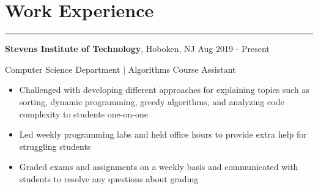 \documentclass[10pt]{article}
\newcommand{\resumesection}[1]{\vspace{-0.2cm}\section*{#1}\vspace{-0.2cm}\hrule\vspace{0.2cm}}
\begin{document}


\resumesection{Work Experience}

\textbf{Stevens Institute of Technology}, Hoboken, NJ \hfill Aug 2019 - Present\par
Computer Science Department $\vert$ Algorithms Course Assistant %
\begin{itemize}
	\item Challenged with developing different approaches for explaining topics such as sorting, dynamic programming, greedy algorithms, and analyzing code complexity to students one-on-one
	\item Led weekly programming labs and held office hours to provide extra help for struggling students
	\item Graded exams and assignments on a weekly basis and communicated with students to resolve any questions about grading
\end{itemize}
\end{document}
